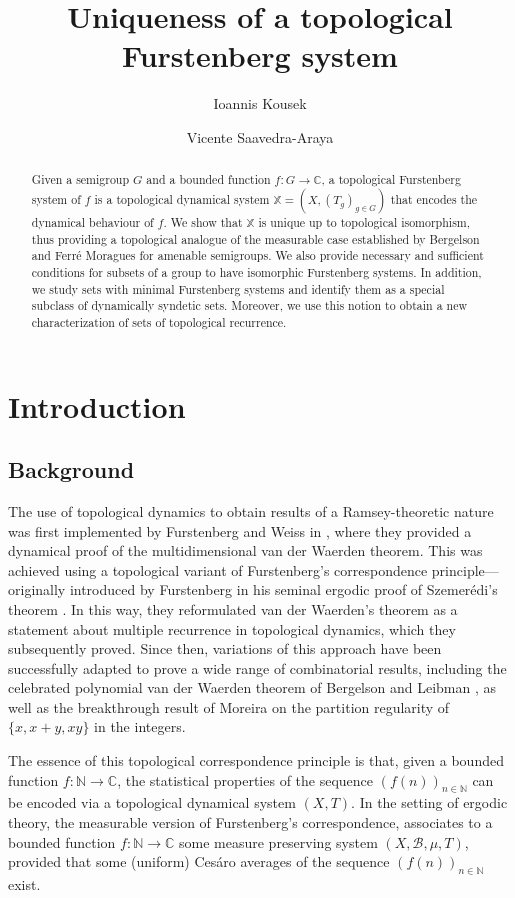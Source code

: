 \documentclass{amsart}
\title{Uniqueness of a topological Furstenberg system}
\author{Ioannis Kousek}
\author{Vicente Saavedra-Araya}
\numberwithin{equation}{section}
\theoremstyle{definition}
\theoremstyle{plain}
\newcommand{\C}{{\mathbb C}}
\newcommand{\N}{{\mathbb N}}
\begin{document}
\begin{abstract}
\small{Given a semigroup $G$ and a bounded function $f: G \to \mathbb{C}$, a topological Furstenberg system of $f$ is a topological dynamical system $\mathbb{X}=(X, (T_g)_{g \in G})$ that encodes the dynamical behaviour of $f$. 
We show that $\mathbb{X}$ is unique up to topological isomorphism, thus providing a topological analogue of the measurable case established by Bergelson and Ferré Moragues for amenable semigroups. We also provide necessary and sufficient conditions for subsets of a
group to have isomorphic Furstenberg systems. In addition, we study sets with minimal Furstenberg systems and identify them 
as a special subclass of dynamically syndetic sets. Moreover, we use this notion to obtain a new characterization of sets of topological recurrence.}
\end{abstract}

\maketitle

\tableofcontents

\section{Introduction}
\label{sec:1}
\subsection{Background}
The use of topological dynamics to obtain results of a Ramsey-theoretic nature
was first implemented by Furstenberg and Weiss in \cite{Furstenberg_Weiss}, where they
provided a dynamical proof of the  multidimensional van der Waerden theorem. This was
achieved using a topological variant of Furstenberg's correspondence
principle—originally introduced by Furstenberg in his seminal ergodic proof
of Szemerédi's theorem \cite{Furstenberg_SzemerediProof}. In this way, they reformulated van der Waerden's theorem as a statement about multiple recurrence in topological dynamics, which they subsequently proved. Since then, variations of this approach have been successfully adapted to
prove a wide range of combinatorial results, including the celebrated
polynomial van der Waerden theorem of Bergelson and Leibman
\cite{Bergelson_Leibman_vdW}, as well as the breakthrough result of Moreira \cite{Moreira} on the partition regularity of $\{x, x+y, xy\}$ in the integers. 


The essence of this topological correspondence principle is that, given a 
bounded function $f:\N\to \C$, the statistical 
properties of the sequence $(f(n))_{n\in \N}$ can be 
encoded via 
a topological dynamical system $(X,T)$. In the setting of 
ergodic theory, the measurable version of Furstenberg's 
correspondence, associates to a bounded function $f:\N\to \C$ some measure preserving system 
$(X,\mathcal{B},\mu,T)$,
provided that some (uniform) Ces\'aro averages of the 
sequence $(f(n))_{n\in\N}$ exist. 
\end{document}
